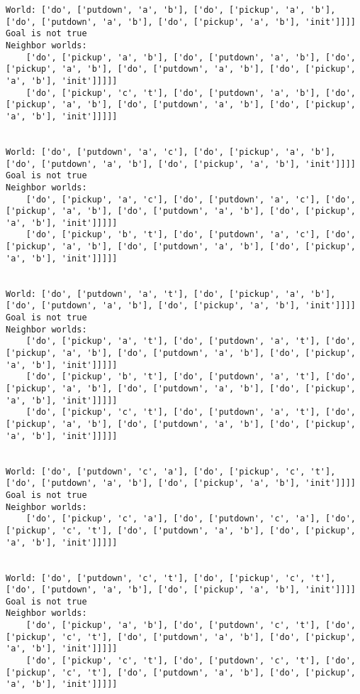 \documentclass[11pt]{article}
\begin{document}
\begin{Verbatim}[commandchars=\\\{\}]
World: ['do', ['putdown', 'a', 'b'], ['do', ['pickup', 'a', 'b'], ['do', ['putdown', 'a', 'b'], ['do', ['pickup', 'a', 'b'], 'init']]]]
Goal is not true
Neighbor worlds:
    ['do', ['pickup', 'a', 'b'], ['do', ['putdown', 'a', 'b'], ['do', ['pickup', 'a', 'b'], ['do', ['putdown', 'a', 'b'], ['do', ['pickup', 'a', 'b'], 'init']]]]]
    ['do', ['pickup', 'c', 't'], ['do', ['putdown', 'a', 'b'], ['do', ['pickup', 'a', 'b'], ['do', ['putdown', 'a', 'b'], ['do', ['pickup', 'a', 'b'], 'init']]]]]


World: ['do', ['putdown', 'a', 'c'], ['do', ['pickup', 'a', 'b'], ['do', ['putdown', 'a', 'b'], ['do', ['pickup', 'a', 'b'], 'init']]]]
Goal is not true
Neighbor worlds:
    ['do', ['pickup', 'a', 'c'], ['do', ['putdown', 'a', 'c'], ['do', ['pickup', 'a', 'b'], ['do', ['putdown', 'a', 'b'], ['do', ['pickup', 'a', 'b'], 'init']]]]]
    ['do', ['pickup', 'b', 't'], ['do', ['putdown', 'a', 'c'], ['do', ['pickup', 'a', 'b'], ['do', ['putdown', 'a', 'b'], ['do', ['pickup', 'a', 'b'], 'init']]]]]


World: ['do', ['putdown', 'a', 't'], ['do', ['pickup', 'a', 'b'], ['do', ['putdown', 'a', 'b'], ['do', ['pickup', 'a', 'b'], 'init']]]]
Goal is not true
Neighbor worlds:
    ['do', ['pickup', 'a', 't'], ['do', ['putdown', 'a', 't'], ['do', ['pickup', 'a', 'b'], ['do', ['putdown', 'a', 'b'], ['do', ['pickup', 'a', 'b'], 'init']]]]]
    ['do', ['pickup', 'b', 't'], ['do', ['putdown', 'a', 't'], ['do', ['pickup', 'a', 'b'], ['do', ['putdown', 'a', 'b'], ['do', ['pickup', 'a', 'b'], 'init']]]]]
    ['do', ['pickup', 'c', 't'], ['do', ['putdown', 'a', 't'], ['do', ['pickup', 'a', 'b'], ['do', ['putdown', 'a', 'b'], ['do', ['pickup', 'a', 'b'], 'init']]]]]


World: ['do', ['putdown', 'c', 'a'], ['do', ['pickup', 'c', 't'], ['do', ['putdown', 'a', 'b'], ['do', ['pickup', 'a', 'b'], 'init']]]]
Goal is not true
Neighbor worlds:
    ['do', ['pickup', 'c', 'a'], ['do', ['putdown', 'c', 'a'], ['do', ['pickup', 'c', 't'], ['do', ['putdown', 'a', 'b'], ['do', ['pickup', 'a', 'b'], 'init']]]]]


World: ['do', ['putdown', 'c', 't'], ['do', ['pickup', 'c', 't'], ['do', ['putdown', 'a', 'b'], ['do', ['pickup', 'a', 'b'], 'init']]]]
Goal is not true
Neighbor worlds:
    ['do', ['pickup', 'a', 'b'], ['do', ['putdown', 'c', 't'], ['do', ['pickup', 'c', 't'], ['do', ['putdown', 'a', 'b'], ['do', ['pickup', 'a', 'b'], 'init']]]]]
    ['do', ['pickup', 'c', 't'], ['do', ['putdown', 'c', 't'], ['do', ['pickup', 'c', 't'], ['do', ['putdown', 'a', 'b'], ['do', ['pickup', 'a', 'b'], 'init']]]]]



\end{Verbatim}
\end{document}
